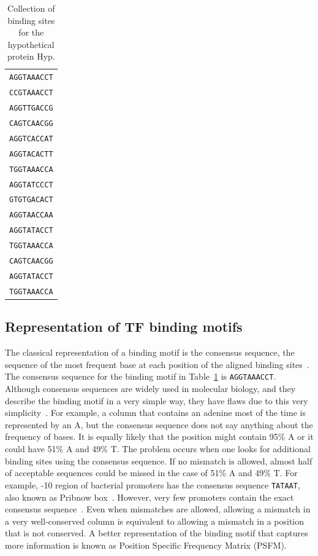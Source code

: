 \begin{table}[h]
  \centering
  \caption{Collection of binding sites for the hypothetical protein Hyp.}
  \label{tab:lexa-motif}
  \begin{tabular}{c}
\texttt{AGGTAAACCT}\\
\texttt{CCGTAAACCT}\\
\texttt{AGGTTGACCG}\\
\texttt{CAGTCAACGG}\\
\texttt{AGGTCACCAT}\\
\texttt{AGGTACACTT}\\
\texttt{TGGTAAACCA}\\
\texttt{AGGTATCCCT}\\
\texttt{GTGTGACACT}\\
\texttt{AGGTAACCAA}\\
\texttt{AGGTATACCT}\\
\texttt{TGGTAAACCA}\\
\texttt{CAGTCAACGG}\\
\texttt{AGGTATACCT}\\
\texttt{TGGTAAACCA}
   \end{tabular}
\end{table}


\subsection{Representation of TF binding motifs}

The classical representation of a binding motif is the consensus sequence, the
sequence of the most frequent base at each position of the aligned binding
sites~\citep{pierce2012genetics}. The consensus sequence for the binding motif
in Table~\ref{tab:lexa-motif} is \texttt{AGGTAAACCT}. Although consensus
sequences are widely used in molecular biology, and they describe the binding
motif in a very simple way, they have flaws due to this very
simplicity~\citep{schneider2002consensus}. For example, a column that contains
an adenine most of the time is represented by an A, but the consensus sequence
does not say anything about the frequency of bases. It is equally likely that
the position might contain 95\% A or it could have 51\% A and 49\% T. The
problem occurs when one looks for additional binding sites using the consensus
sequence.  If no mismatch is allowed, almost half of acceptable sequences could
be missed in the case of 51\% A and 49\% T. For example, -10 region of
bacterial promoters has the consensus sequence \texttt{TATAAT}, also known as
Pribnow box~\citep{pribnow1975nucleotide}. However,  very few promoters
contain the exact consensus sequence~\citep{lisser1993compilation}. Even when
mismatches are allowed, allowing a mismatch in a very well-conserved column
is equivalent to allowing a mismatch in a position that is not
conserved. A better representation of the binding motif that captures more
information is known as Position Specific Frequency Matrix (PSFM).

